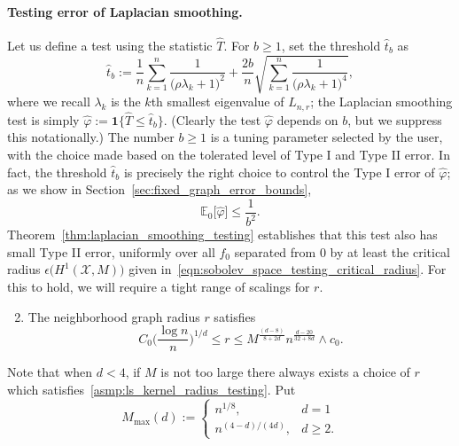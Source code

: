 \documentclass[twoside]{article}
\newcommand{\1}{\mathbf{1}}
\newcommand{\Lap}{L}
\newcommand{\Xset}{\mathcal{X}}
\newcommand{\Ebb}{\mathbb{E}}
\newcommand{\wh}[1]{\widehat{#1}}
\theoremstyle{definition}
\theoremstyle{remark}
\begin{document}
\paragraph{Testing error of Laplacian smoothing.}
Let us define a test using the statistic $\wh{T}$. For $b \geq 1$, set the threshold $\wh{t}_b$ as
\begin{equation*}
\wh{t}_{b} := \frac{1}{n}\sum_{k = 1}^{n} \frac{1}{\bigl(\rho \lambda_k + 1\bigr)^2} + \frac{2b}{n}\sqrt{\sum_{k = 1}^{n} \frac{1}{\bigl(\rho \lambda_k + 1\bigr)^4}},
\end{equation*}
where we recall $\lambda_k$ is the $k$th smallest eigenvalue of $\Lap_{n,r}$; the Laplacian smoothing test is simply $\wh{\varphi} := \1\bigl\{\wh{T} \leq \wh{t}_b\bigr\}$. (Clearly the test $\wh{\varphi}$ depends on $b$, but we suppress this notationally.) The number $b \geq 1$ is a tuning parameter selected by the user, with the choice made based on the tolerated level of Type I and Type II error. In fact, the threshold $\wh{t}_b$ is precisely the right choice to control the Type I error of $\wh{\varphi}$; as we show in Section~\ref{sec:fixed_graph_error_bounds},
\begin{equation}
\label{eqn:type_I_error}
\Ebb_0\bigl[\wh{\varphi}\bigr] \leq \frac{1}{b^2}.
\end{equation}
Theorem~\ref{thm:laplacian_smoothing_testing} establishes that this test also has small Type II error, uniformly over all $f_0$ separated from $0$ by at least the critical radius $\epsilon\bigl(H^1(\Xset,M)\bigr)$ given in~\eqref{eqn:sobolev_space_testing_critical_radius}. For this to hold, we will require a tight range of scalings for $r$.
\begin{enumerate}[label=(R\arabic*)]
	\setcounter{enumi}{1}
	\item 
	\label{asmp:ls_kernel_radius_testing}
	The neighborhood graph radius $r$ satisfies
	\begin{equation*}
	C_0\biggl(\frac{\log n}{n}\biggr)^{1/d} \leq r \leq M^{\frac{(d - 8)}{8 + 2d}}n^{\frac{d - 20}{32 + 8d}} \wedge c_0.
	\end{equation*}
\end{enumerate}
Note that when $d < 4$, if $M$ is not too large there always exists a choice of $r$ which satisfies~\ref{asmp:ls_kernel_radius_testing}. Put
\begin{equation*}
M_{\max}(d) := 
\begin{cases*}
n^{1/8},& \textrm{$d = 1$}\\
n^{(4 - d)/(4d)},& \textrm{$d \geq 2$}.
\end{cases*}
\end{equation*}
\end{document}
